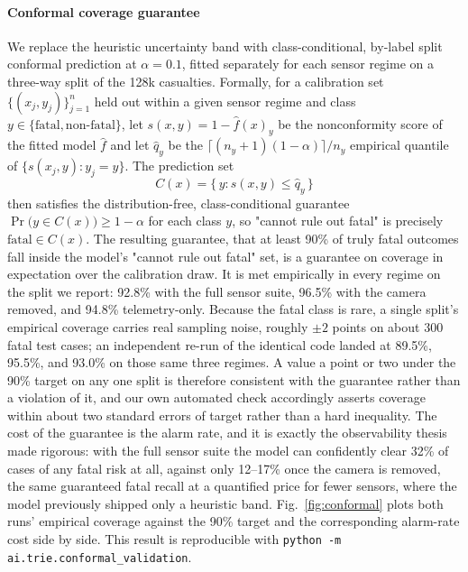 \documentclass[journal]{IEEEtran}
\begin{document}
\paragraph{Conformal coverage guarantee} We replace the heuristic uncertainty band with class-conditional, by-label split conformal prediction at $\alpha=0.1$, fitted separately for each sensor regime on a three-way split of the 128k casualties. Formally, for a calibration set $\{(x_j, y_j)\}_{j=1}^{n}$ held out within a given sensor regime and class $y \in \{\mathrm{fatal}, \mathrm{non\text{-}fatal}\}$, let $s(x,y) = 1 - \hat f(x)_y$ be the nonconformity score of the fitted model $\hat f$ and let $\hat q_y$ be the $\lceil (n_y+1)(1-\alpha) \rceil / n_y$ empirical quantile of $\{s(x_j, y) : y_j = y\}$. The prediction set
\begin{equation}
C(x) = \{\, y : s(x,y) \leq \hat q_y \,\}
\label{eq:conformal-set}
\end{equation}
then satisfies the distribution-free, class-conditional guarantee $\Pr\big(y \in C(x)\big) \geq 1-\alpha$ for each class $y$, so "cannot rule out fatal" is precisely $\mathrm{fatal} \in C(x)$. The resulting guarantee, that at least 90\% of truly fatal outcomes fall inside the model's "cannot rule out fatal" set, is a guarantee on coverage in expectation over the calibration draw. It is met empirically in every regime on the split we report: 92.8\% with the full sensor suite, 96.5\% with the camera removed, and 94.8\% telemetry-only. Because the fatal class is rare, a single split's empirical coverage carries real sampling noise, roughly $\pm2$ points on about 300 fatal test cases; an independent re-run of the identical code landed at 89.5\%, 95.5\%, and 93.0\% on those same three regimes. A value a point or two under the 90\% target on any one split is therefore consistent with the guarantee rather than a violation of it, and our own automated check accordingly asserts coverage within about two standard errors of target rather than a hard inequality. The cost of the guarantee is the alarm rate, and it is exactly the observability thesis made rigorous: with the full sensor suite the model can confidently clear 32\% of cases of any fatal risk at all, against only 12--17\% once the camera is removed, the same guaranteed fatal recall at a quantified price for fewer sensors, where the model previously shipped only a heuristic band. Fig.~\ref{fig:conformal} plots both runs' empirical coverage against the 90\% target and the corresponding alarm-rate cost side by side. This result is reproducible with \texttt{python -m ai.trie.conformal\_validation}.
\end{document}
